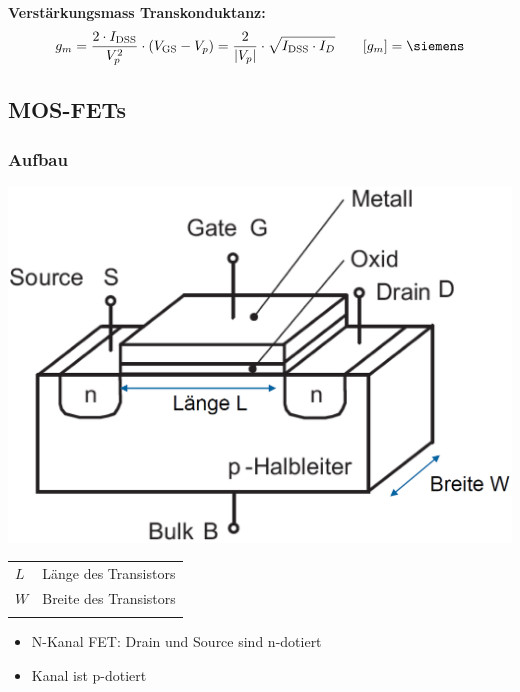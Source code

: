 \vspace{0.2cm}
\textbf{Verstärkungsmass Transkonduktanz:}
$$  g_m = \frac{ 2 \cdot I_{\rm DSS}}{V_p^2} \cdot ( V_{\rm GS} - V_p ) = \frac{2}{| V_p |} \cdot \sqrt{I_{\rm DSS} \cdot I_D} \qquad [g_m] = \siemens $$


\subsection{MOS-FETs}

\subsubsection{Aufbau}

\begin{minipage}[t]{0.35\columnwidth}
    \includegraphics[align=c, width=\columnwidth]{images/mos_fet_aufbau.png}
\end{minipage}
\hfill
\begin{minipage}[c]{0.6\columnwidth}
    \begin{tabular}{l l}
        $L$ & Länge des Transistors  \\
        $W$ & Breite des Transistors \\
        \\
    \end{tabular}

    \begin{itemize}
        \item N-Kanal FET: Drain und Source sind n-dotiert
        \item Kanal ist p-dotiert
    \end{itemize}
\end{minipage}


